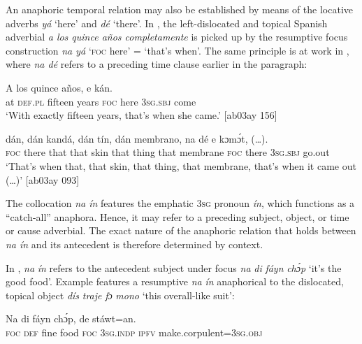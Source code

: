 An anaphoric temporal relation may also be established by means of the locative adverbs \textit{yá} ‘here’ and \textit{dé} ‘there’. In , the left-dislocated and topical Spanish adverbial \textit{a los quince años completamente} is picked up by the resumptive focus construction \textit{na yá} ‘\textsc{foc} here’ = ‘that’s when’. The same principle is at work in , where \textit{na dé} refers to a preceding time clause earlier in the paragraph: 


\ea%
    \label{ex:key:719}
    \gll A  los    quince  años,       e    kán.\\
at  \textsc{def.pl}  fifteen  years  \textsc{foc}  here    \textsc{3sg.sbj}  come\\

\glt ‘With exactly fifteen years, that’s when she came.’ [ab03ay 156]
\z


\ea%
    \label{ex:key:720}
    \gll {}     dán,    dán  kandá,  dán  tín,    dán  membrano,
na  dé    e    kɔmɔ́t,  (…).\\
\textsc{foc}  there  that    that  skin    that  thing  that  membrane
\textsc{foc}  there  \textsc{3sg.sbj}  go.out\\

\glt ‘That’s when that, that skin, that thing, that membrane, that’s when 
it came out (…)’ [ab03ay 093]
\z

The collocation \textit{na ín} features the emphatic \textsc{3sg} pronoun \textit{ín}, which functions as a “catch-all” anaphora. Hence, it may refer to a preceding subject, object, or time or cause adverbial. The exact nature of the anaphoric relation that holds between \textit{na ín} and its antecedent is therefore determined by context.


In , \textit{na} \textit{ín} refers to the antecedent subject under focus \textit{na} \textit{di} \textit{fáyn} \textit{chɔ́p} ‘it’s the good food’. Example  features a resumptive \textit{na} \textit{ín} anaphorical to the dislocated, topical object \textit{dís} \textit{traje} \textit{fɔ} \textit{mono} ‘this overall-like suit’:



\ea%
    \label{ex:key:721}
    \gll Na  di  fáyn    chɔ́p,       de  stáwt=an.\\
\textsc{foc}  \textsc{def}  fine    food    \textsc{foc}  \textsc{3sg.indp}  \textsc{ipfv}  make.corpulent=\textsc{3sg.obj}\\

